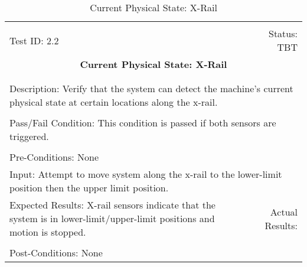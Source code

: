 \documentclass[titlepage]{article}
\begin{document}
\begin{center}%
\begin{table}
\begin{tabular}{|l r|}\hline&\\[-2mm]
	Test ID: 2.2	&Status: TBT\\[-3mm]
	\multicolumn{2}{|c|}{\textbf{\large{Current Physical State: X-Rail}}}\\&\\\hline&\\[-3mm]
	\multicolumn{2}{|p{\textwidth}|}{Description: Verify that the system can detect the machine's current physical state at certain locations along the x-rail.}\\[1mm]\hline&\\[-3mm]
	\multicolumn{2}{|p{\textwidth}|}{Pass/Fail Condition: This condition is passed if both sensors are triggered.}\\[1mm]\hline&\\[-3mm]
	\multicolumn{2}{|p{\textwidth}|}{Pre-Conditions: None}\\[4mm]
	\multicolumn{2}{|p{\textwidth}|}{Input: Attempt to move system along the x-rail to the lower-limit position then the upper limit position.}\\[2mm]\hline
	\multicolumn{1}{|p{0.49\textwidth}}{Expected Results: X-rail sensors indicate that the system is in lower-limit/upper-limit positions and motion is stopped.}	&\multicolumn{1}{|p{0.45\textwidth}|}{Actual Results:}\\\hline&\\[-3mm]
	\multicolumn{2}{|p{\textwidth}|}{Post-Conditions: None}\\\hline
\end{tabular}
\caption{Current Physical State: X-Rail}
\end{table}
\end{center}
\end{document}
